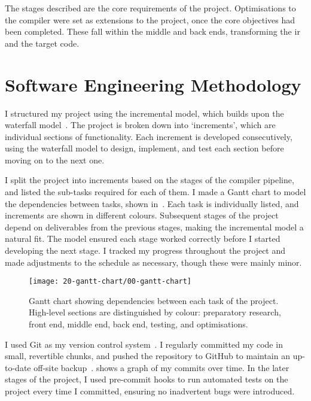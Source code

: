 \documentclass[00-main.tex]{subfiles}
\begin{document}
The stages described are the core requirements of the project.
Optimisations to the compiler were set as extensions to the project, once the core objectives had been completed.
These fall within the middle and back ends, transforming the \gls{ir} and the target code.



\section{Software Engineering Methodology}

I structured my project using the incremental model, which builds upon the waterfall model~.
The project is broken down into `increments', which are individual sections of functionality.
Each increment is developed consecutively, using the waterfall model to design, implement, and test each section before moving on to the next one.

I split the project into increments based on the stages of the compiler pipeline, and listed the sub-tasks required for each of them.
I made a Gantt chart to model the dependencies between tasks, shown in~.
Each task is individually listed, and increments are shown in different colours.
Subsequent stages of the project depend on deliverables from the previous stages, making the incremental model a natural fit.
The model ensured each stage worked correctly before I started developing the next stage.
I tracked my progress throughout the project and made adjustments to the schedule as necessary, though these were mainly minor.


\begin{figure}[b]
  \centering
  \texttt{[image: 20-gantt-chart/00-gantt-chart]}
  \caption{Gantt chart showing dependencies between each task of the project. High-level sections are distinguished by colour: preparatory research, front end, middle end, back end, testing, and optimisations.}%
  \label{fig:gantt chart}
\end{figure}

I used Git as my version control system~.
I regularly committed my code in small, revertible chunks, and pushed the repository to GitHub to maintain an up-to-date off-site backup~.
 shows a graph of my commits over time.
In the later stages of the project, I used pre-commit hooks to run automated tests on the project every time I committed, ensuring no inadvertent bugs were introduced.
\end{document}
